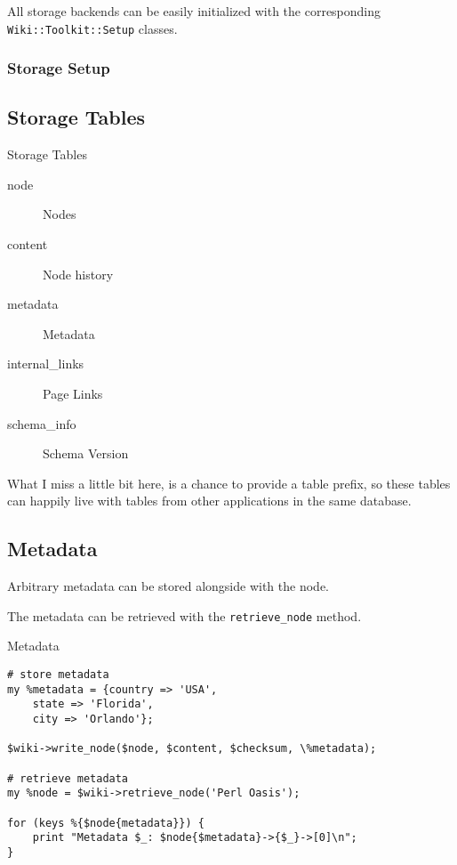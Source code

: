 
All storage backends can be easily initialized with the corresponding
\verb+Wiki::Toolkit::Setup+ classes.

\begin{frame}[fragile]
\frametitle{Storage Setup}

\end{frame}

\subsection{Storage Tables}

\begin{frame}{Storage Tables}
 \begin{description}
  \item[node] Nodes
  \item [content] Node history
  \item [metadata] Metadata
  \item [internal\_links] Page Links
  \item [schema\_info] Schema Version
 \end{description}
\end{frame}

What I miss a little bit here, is a chance to provide a table prefix,
so these tables can happily live with tables from other applications
in the same database.

\subsection{Metadata}


Arbitrary metadata can be stored alongside with the node.

The metadata can be retrieved with the \verb+retrieve_node+ method.

\begin{frame}[fragile]{Metadata}
\begin{lstlisting}
# store metadata
my %metadata = {country => 'USA', 
    state => 'Florida',
    city => 'Orlando'};

$wiki->write_node($node, $content, $checksum, \%metadata);

# retrieve metadata
my %node = $wiki->retrieve_node('Perl Oasis');

for (keys %{$node{metadata}}) {
    print "Metadata $_: $node{$metadata}->{$_}->[0]\n";
}
\end{lstlisting}
\end{frame}

